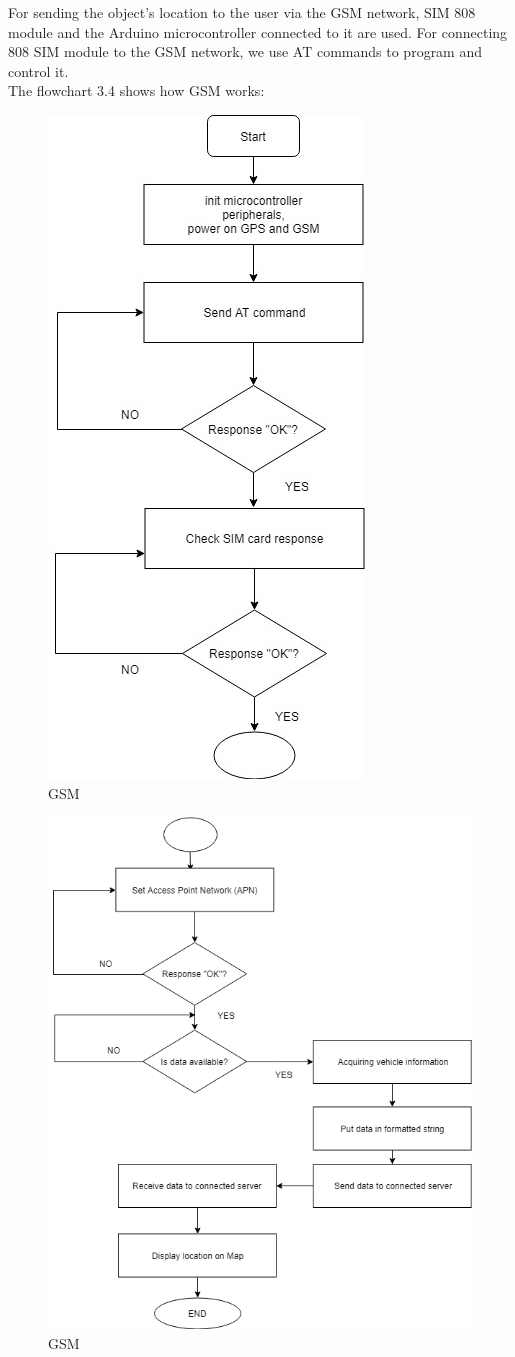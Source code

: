 For sending the object's location to the user via the GSM network, SIM 808 module and the Arduino microcontroller connected to it are used. For connecting 808 SIM module to the GSM network, we use AT commands to program and control it.\\
\newpage
The flowchart 3.4 shows how GSM works:\\
\begin{figure}[!h]
	\centerline{\includegraphics[width=.6\textwidth]{gsm-flowchart}}
	\caption{GSM \cite{8}}
\end{figure}
\newpage
\begin{figure}[!h]
	\centerline{\includegraphics[width=.9\textwidth]{continue-gsm}}
	\caption{GSM \cite{8}}
\end{figure}